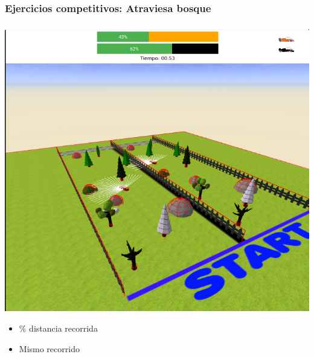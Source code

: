 \documentclass[xcolor={table}]{beamer}
\begin{document}
		\begin{frame}
			\frametitle{\LARGE{Ejercicios competitivos: Atraviesa bosque}}
			
	\begin{minipage}{.48\textwidth}
      \includegraphics[scale=0.25]{img/evaluador_forest.png}
        \end{minipage}
      \begin{minipage}{.50\textwidth}
      \begin{itemize}
      \begin{itemize}{}\itemsep5pt
          \item \% distancia recorrida
          \item Mismo recorrido 
      \end{itemize}
       \end{itemize}
    \end{minipage}
		\end{frame}
		
\end{document}
